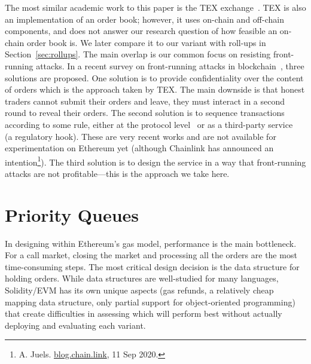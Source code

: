 The most similar academic work to this paper is the TEX exchange~\cite{khalil2019tex}. TEX is also an implementation of an order book; however, it uses on-chain and off-chain components, and does not answer our research question of how feasible an on-chain order book is. We later compare it to our variant with roll-ups in Section~\ref{sec:rollups}. The main overlap is our common focus on resisting front-running attacks. In a recent survey on front-running attacks in blockchain~\cite{eskandari2019sok}, three solutions are proposed. One solution is to provide confidentiality over the content of orders which is the approach taken by TEX. The main downside is that honest traders cannot submit their orders and leave, they must interact in a second round to reveal their orders. The second solution is to sequence transactions according to some rule, either at the protocol level~\cite{MZGA20} or as a third-party service~\cite{Kla20} (a regulatory hook). These are very recent works and are not available for experimentation on Ethereum yet (although Chainlink has announced an intention\footnote{A. Juels. \href{https://blog.chain.link/chainlink-fair-sequencing-services-enabling-a-provably-fair-defi-ecosystem/}{blog.chain.link}, 11 Sep 2020.}). The third solution is to design the service in a way that front-running attacks are not profitable---this is the approach we take here. 



\section{Priority Queues}\label{sec:pq}



In designing \cm within Ethereum's gas model, performance is the main bottleneck. For a call market, closing the market and processing all the orders are the most time-consuming steps. The most critical design decision is the data structure for holding orders. While data structures are well-studied for many languages, Solidity/EVM has its own unique aspects (\eg gas refunds, a relatively cheap mapping data structure, only partial support for object-oriented programming) that create difficulties in assessing which will perform best without actually deploying and evaluating each variant. 

